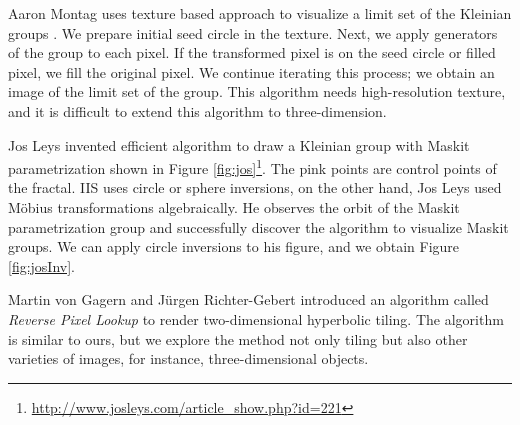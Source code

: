 Aaron Montag uses texture based approach to visualize a limit set of the
Kleinian groups \cite{Montag2014hyperbolicIFS}.
We prepare initial seed circle in the texture.
Next, we apply generators of the group to each pixel.
If the transformed pixel is on the seed circle or filled pixel, we fill the original pixel.
We continue iterating this process; we obtain an image of the limit set of
the group.
This algorithm needs high-resolution texture, and it is difficult to
extend this algorithm to three-dimension.

Jos Leys invented efficient algorithm to draw a Kleinian group with Maskit
parametrization shown in Figure
\ref{fig:jos}\footnote{\url{http://www.josleys.com/article_show.php?id=221}}. 
The pink points are control points of the fractal.
IIS uses circle or sphere inversions, on the other hand, Jos Leys used
M\"obius transformations algebraically.
He observes the orbit of the Maskit parametrization group and
successfully discover the algorithm to visualize Maskit groups.
We can apply circle inversions to his figure, and we obtain Figure \ref{fig:josInv}.

Martin von Gagern and J\"urgen Richter-Gebert introduced an algorithm
called \textit{Reverse Pixel Lookup}
\cite{journals/combinatorics/GagernR09} to render two-dimensional
hyperbolic tiling.
The algorithm is similar to ours, but
we explore the method not only tiling but also other varieties of
images, for instance, three-dimensional objects.
